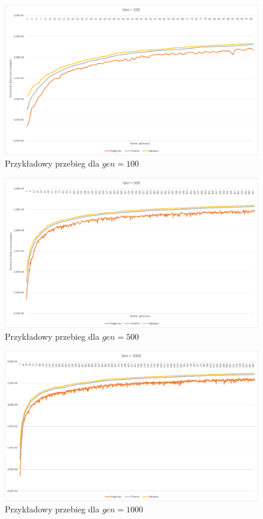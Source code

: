 \documentclass{article}
\begin{document}
	\begin{figure}[H]
		\centering
		\includegraphics[width=1\linewidth]{gen100.png}
		\caption{Przykładowy przebieg dla $gen=100$}
		\label{fig:gen100}
	\end{figure}
	
	
	\begin{figure}[H]
		\centering
		\includegraphics[width=1\linewidth]{gen500.png}
		\caption{Przykładowy przebieg dla $gen=500$}
		\label{fig:gen500}
	\end{figure}
	
	\begin{figure}[H]
		\centering
		\includegraphics[width=1\linewidth]{gen1000.png}
		\caption{Przykładowy przebieg dla $gen=1000$}
		\label{fig:gen1000}
	\end{figure}
	
\end{document}

